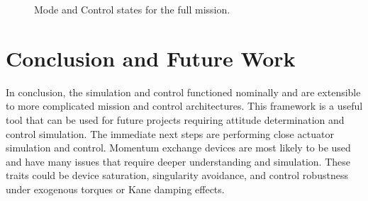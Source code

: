 \documentclass[paper]{aiaaNew}
\begin{document}
\begin{figure}[!htbp] 
\centering     %
{}
\caption{Mode and Control states for the full mission.}
\end{figure}





\clearpage
\section{Conclusion and Future Work}
In conclusion, the simulation and control functioned nominally and are extensible to more complicated mission and control architectures. This framework is a useful tool that can be used for future projects requiring attitude determination and control simulation. The immediate next steps are performing close actuator simulation and control. Momentum exchange devices are most likely to be used and have many issues that require deeper understanding and simulation. These traits could be device saturation, singularity avoidance, and control robustness under exogenous torques or Kane damping effects.
\end{document}
